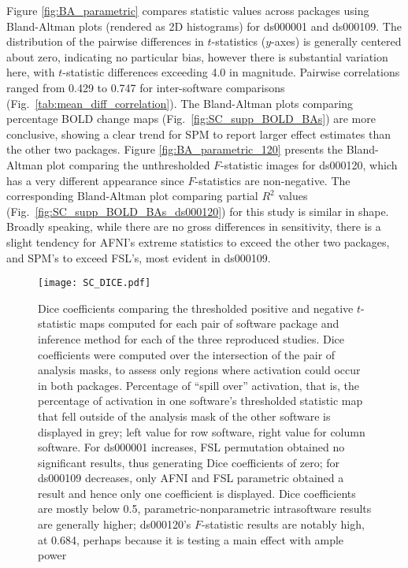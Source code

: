 Figure \ref{fig:BA_parametric} compares statistic values across packages using Bland-Altman plots (rendered as 2D histograms) for ds000001 and ds000109. The distribution of the pairwise differences in $t$-statistics ($y$-axes) is generally centered about zero, indicating no particular bias, however there is substantial variation here, with $t$-statistic differences exceeding 4.0 in magnitude. Pairwise correlations ranged from 0.429 to 0.747 for inter-software comparisons (Fig.\ \ref{tab:mean_diff_correlation}). The Bland-Altman plots comparing percentage BOLD change maps (Fig.\ \ref{fig:SC_supp_BOLD_BAs}) are more conclusive, showing a clear trend for SPM to report larger effect estimates than the other two packages. Figure \ref{fig:BA_parametric_120} presents the Bland-Altman plot comparing the unthresholded $F$-statistic images for ds000120, which has a very different appearance since $F$-statistics are non-negative. The corresponding Bland-Altman plot comparing partial $R^{2}$ values (Fig.\ \ref{fig:SC_supp_BOLD_BAs_ds000120}) for this study is similar in shape. Broadly speaking, while there are no gross differences in sensitivity, there is a slight tendency for AFNI's extreme statistics to exceed  the other two packages, and SPM's to exceed FSL's, most evident in ds000109. 

\begin{sidewaysfigure}[htbp]
\centering
	\texttt{[image: SC\_DICE.pdf]}	
\caption{Dice coefficients comparing the thresholded positive and negative $t$-statistic maps computed for each pair of software package and inference method for each of the three reproduced studies. Dice coefficients were computed over the intersection of the pair of analysis masks, to assess only regions where activation could occur in both packages. Percentage of ``spill over'' activation, that is, the percentage of activation in one software's thresholded statistic map that fell outside of the analysis mask of the other software is displayed in grey; left value for row software, right value for column software. For ds000001 increases, FSL permutation obtained no significant results, thus generating Dice coefficients of zero; for ds000109 decreases, only AFNI and FSL parametric obtained a result and hence only one coefficient is displayed. Dice coefficients are mostly below 0.5, parametric-nonparametric intrasoftware results are generally higher; ds000120's $F$-statistic results are notably high, at 0.684, perhaps because it is testing a main effect with ample power }
\label{fig:DICE}
\end{sidewaysfigure}

